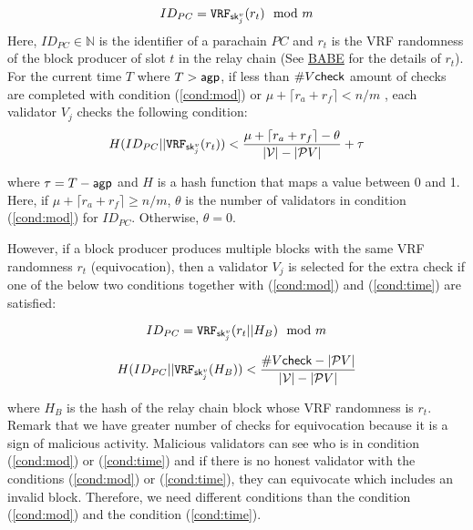 \begin{enumerate}
    \begin{equation}\label{cond:mod}
        ID_{PC} = \mathtt{VRF}_{\mathsf{sk}^v_{j}}(r_{t}) \mod m    
    \end{equation}
     Here, $ID_{PC} \in \mathbb{N}$ is the identifier of a parachain $PC$ and $r_{t}$ is the VRF randomness of the block producer of slot $t$ in the relay chain (See \href{http://research.web3.foundation/en/latest/polkadot/BABE/Babe/}{BABE} for the details of $r_t$). For the current time $T$ where $T > \mathsf{agp}$, if  less than $\#V\mathsf{check}$ amount of checks are completed with condition (\ref{cond:mod}) or $\mu + \lceil r_a + r_f \rceil < n/m$ , each validator $V_j$ checks the following condition:
     \begin{equation}\label{cond:time}
        H(ID_{PC} || \mathtt{VRF}_{\mathsf{sk}^v_j}(r_t)) < \frac{\mu + \lceil r_a + r_f \rceil - \theta}{|\mathcal{V}|-|\mathcal{P}V|}+\tau  
    \end{equation}
    
      where $\tau = T- \mathsf{agp}$ and $H$ is a hash function that maps a value between 0 and 1. Here, if $\mu + \lceil r_a + r_f \rceil \geq n/m$, $\theta$ is the number of validators in condition (\ref{cond:mod}) for $ID_{PC}$. Otherwise, $\theta = 0$.
    
    However, if a block producer produces multiple blocks with the same VRF randomness $r_t$ (equivocation), then a validator $V_j$ is selected for the extra check if one of the  below two conditions together with (\ref{cond:mod}) and (\ref{cond:time}) are satisfied:
    
    
    \begin{equation}\label{cond:modequiv}
         ID_{PC} = \mathtt{VRF}_{\mathsf{sk}^v_{j}}(r_{t}||H_B) \mod m
    \end{equation}
    
    \begin{equation}\label{cond:equiv}
         H(ID_{PC} || \mathtt{VRF}_{\mathsf{sk}^v_j}(H_{B})) < \frac{\#V\mathsf{check} - |\mathcal{P}V|}{|\mathcal{V}|-|\mathcal{P}V|}   
    \end{equation}
    
     where $H_B$ is the hash of the relay chain block whose VRF randomness is $r_t$. Remark that we have greater number of checks for equivocation because it is a sign of malicious activity. Malicious validators can see who is in condition (\ref{cond:mod}) or (\ref{cond:time}) and if there is  no honest validator with the conditions (\ref{cond:mod}) or (\ref{cond:time}), they can equivocate which includes an invalid block. Therefore, we need different conditions than the condition (\ref{cond:mod}) and the condition (\ref{cond:time}).
    

\end{enumerate}
